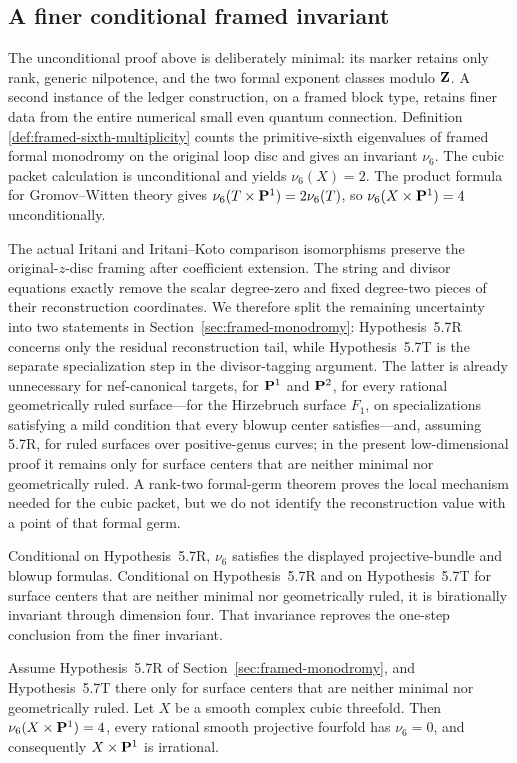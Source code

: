 \subsection*{A finer conditional framed invariant}

The unconditional proof above is deliberately minimal: its marker retains
only rank, generic nilpotence, and the two formal exponent classes modulo
\(\mathbf Z\).  A second instance
of the ledger construction, on a framed block type, retains finer data from
the entire numerical small even quantum connection.  Definition
\ref{def:framed-sixth-multiplicity} counts the primitive-sixth eigenvalues
of framed formal monodromy on the original loop disc and gives an invariant
\(\nu_6\).  The cubic packet calculation is unconditional and yields
\(\nu_6(X)=2\).  The product formula for Gromov--Witten theory gives
\(\nu_6(T\times\mathbf P^1)=2\nu_6(T)\), so
\(\nu_6(X\times\mathbf P^1)=4\) unconditionally.

The actual Iritani and Iritani--Koto comparison isomorphisms preserve the
original-\(z\)-disc framing after coefficient extension.  The string and
divisor equations exactly remove the scalar degree-zero and fixed
degree-two pieces of their reconstruction coordinates.  We therefore split
the remaining uncertainty into two statements in
Section~\ref{sec:framed-monodromy}: Hypothesis~5.7R concerns only the
residual reconstruction tail, while Hypothesis~5.7T is
the separate specialization step in the divisor-tagging argument.  The latter
is already unnecessary for nef-canonical targets, for \(\mathbf P^1\) and
\(\mathbf P^2\), for every rational geometrically ruled surface---for the Hirzebruch
surface \(F_1\), on specializations satisfying a mild condition that every
blowup center satisfies---and, assuming 5.7R, for ruled surfaces over
positive-genus curves; in the present low-dimensional proof it remains only for
surface centers that are neither minimal nor geometrically ruled.  A
rank-two formal-germ theorem proves the
local mechanism needed for the cubic packet, but we do not identify the
reconstruction value with a point of that formal germ.

Conditional on Hypothesis~5.7R, \(\nu_6\) satisfies the displayed
projective-bundle and blowup formulas.  Conditional on Hypothesis~5.7R and on
Hypothesis~5.7T for surface centers that are neither minimal nor geometrically
ruled, it is birationally invariant through dimension four.  That invariance reproves
the one-step conclusion from
the finer invariant.

\begin{theorem}
\label{thm:every-cubic-conditional}
%
%
Assume Hypothesis~5.7R of Section~\ref{sec:framed-monodromy}, and
Hypothesis~5.7T there only for surface centers that are neither minimal nor
geometrically ruled.  Let
\(X\) be a smooth complex cubic threefold.  Then
\(\nu_6(X\times\mathbf P^1)=4\), every rational smooth projective fourfold has
\(\nu_6=0\), and consequently \(X\times\mathbf P^1\) is irrational.
\end{theorem}

